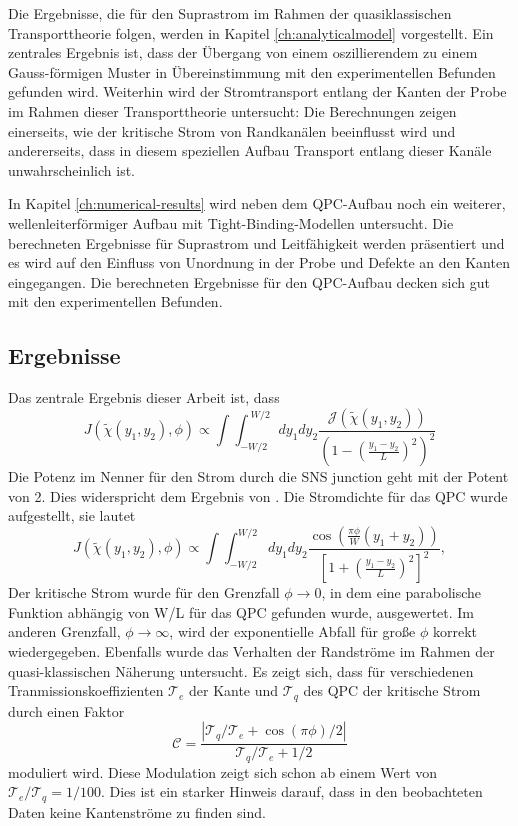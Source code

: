 Die Ergebnisse, die f\"ur den Suprastrom im Rahmen der quasiklassischen Transporttheorie folgen, werden in Kapitel  \ref{ch:analyticalmodel} vorgestellt. Ein zentrales Ergebnis ist, dass der \"Ubergang von einem oszillierendem zu einem Gauss-f\"ormigen Muster in \"Ubereinstimmung mit den experimentellen Befunden gefunden wird. Weiterhin wird der Stromtransport entlang der Kanten der Probe im Rahmen dieser Transporttheorie untersucht: Die Berechnungen zeigen einerseits, wie der kritische Strom von Randkan\"alen beeinflusst wird und andererseits, dass in diesem speziellen Aufbau Transport entlang dieser Kan\"ale unwahrscheinlich ist.

In Kapitel \ref{ch:numerical-results} wird neben dem QPC-Aufbau noch ein weiterer, wellenleiterf\"ormiger Aufbau mit Tight-Binding-Modellen untersucht. Die berechneten Ergebnisse f\"ur Suprastrom und Leitf\"ahigkeit werden pr\"asentiert und es wird auf den Einfluss von Unordnung in der Probe und Defekte an den Kanten eingegangen. Die berechneten Ergebnisse f\"ur den QPC-Aufbau decken sich gut mit den experimentellen Befunden.

\subsection*{Ergebnisse}
Das zentrale Ergebnis dieser Arbeit ist, dass
\begin{equation}
J(\tilde{\chi}(y_1, y_2), \phi) \propto \int \int_{-W/2}^{~W/2} dy_1 dy_2 \frac{ \mathcal{J}(\tilde{\chi}(y_1, y_2)) }{ \left( 1 - \left(\frac{y_1 - y_2}{L}\right)^2 \right)^2 }
\end{equation}
Die Potenz im Nenner f\"ur den Strom durch die SNS junction geht mit der Potent von 2. Dies widerspricht dem Ergebnis von \cite{Barzykin1999}. 
Die Stromdichte f\"ur das QPC wurde aufgestellt, sie lautet
\begin{equation}
J(\tilde{\chi}(y_1, y_2), \phi) \propto \int \int_{-W/2}^{W/2} d y_1 d y_2 \frac{\cos \left( \frac{\pi \phi}{W}(y_1 + y_2) \right)}{\left[ 1 + \left(\frac{y_1 - y_2}{L}\right)^2\right]^2} \label{eq:josephson_current},
\end{equation}
Der kritische Strom wurde f\"ur den Grenzfall $\phi \rightarrow 0$, in dem eine parabolische Funktion abh\"angig von W/L f\"ur das QPC gefunden wurde, ausgewertet. Im anderen Grenzfall, $\phi \rightarrow \infty$, wird der exponentielle Abfall f\"ur gro{\ss}e $\phi$ korrekt wiedergegeben. Ebenfalls wurde das Verhalten der Randstr\"ome im Rahmen der quasi-klassischen N\"aherung untersucht. Es zeigt sich, dass f\"ur verschiedenen Tranmissionskoeffizienten $\mathcal{T}_e$ der Kante und $\mathcal{T}_q$ des QPC der kritische Strom durch einen Faktor 
\begin{equation}
\mathcal{C} =  \frac{| \mathcal{T}_q / \mathcal{T}_e + \cos \left( \pi \phi \right)/2 |}{\mathcal{T}_q / \mathcal{T}_e + 1/2}
\end{equation}
moduliert wird. Diese Modulation zeigt sich schon ab einem Wert von $\mathcal{T}_e/ \mathcal{T}_q = 1 / 100$. Dies ist ein starker Hinweis darauf, dass in den beobachteten Daten keine Kantenstr\"ome zu finden sind.

